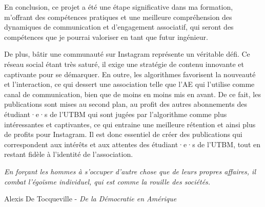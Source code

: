 En conclusion, ce projet a été une étape significative dans ma formation, m'offrant des compétences pratiques et une meilleure compréhension des dynamiques de communication et d'engagement associatif, qui seront des compétences que je pourrai valoriser en tant que futur ingénieur.

De plus, bâtir une communauté sur Instagram représente un véritable défi.
Ce réseau social étant très saturé, il exige une stratégie de contenu innovante et captivante pour se démarquer.
En outre, les algorithmes favorisent la nouveauté et l'interaction, ce qui dessert une association telle que l'\gls{AE} qui l'utilise comme canal de communication, bien que de moins en moins mis en avant.
De ce fait, les publications sont mises au second plan, au profit des autres abonnements des étudiant·e·s de l'\gls{UTBM} qui sont jugées par l'algorithme comme plus intéressantes et captivantes, ce qui entraine une meilleure rétention et ainsi plus de profits pour Instagram.
Il est donc essentiel de créer des publications qui correspondent aux intérêts et aux attentes des étudiant·e·s de l'\gls{UTBM}, tout en restant fidèle à l'identité de l'association.


\begin{center}
    \textit{\og En forçant les hommes à s'occuper d'autre chose que de leurs propres affaires, il combat l'égoïsme individuel, qui est comme la rouille des sociétés. \fg{}}

    Alexis De Tocqueville - \textit{De la Démocratie en Amérique}\cite{De_la_Democratie_en_Amerique}
\end{center}
